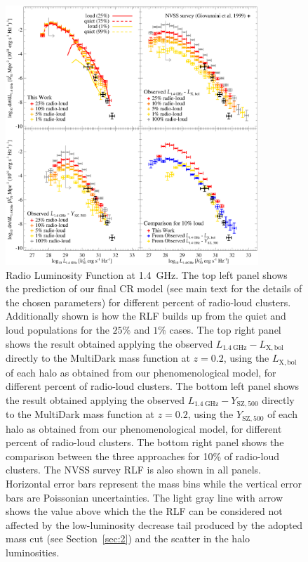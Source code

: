 \documentclass[traditabstract]{aa}
\newcommand{\rmn}{\mathrm}
\begin{document}
\begin{figure}[t]
\centering
\includegraphics[width=0.85\textwidth]{figures/RLFs_1.4.eps}
\caption{Radio Luminosity Function at 1.4~GHz. The top left panel shows the prediction of our final CR model (see main text for the details of the chosen parameters) for different percent of radio-loud clusters. Additionally shown is how the RLF builds up from the quiet and loud populations for the $25\%$ and $1\%$ cases. The top right panel shows the result obtained applying the observed $L_{1.4~\rmn{GHz}}-L_{\rmn{X,bol}}$ directly to the MultiDark mass function at  $z = 0.2$, using the $L_{\rmn{X,bol}}$ of each halo as obtained from our phenomenological model, for different percent of radio-loud clusters. The bottom left panel shows the result obtained applying the observed $L_{1.4~\rmn{GHz}}-Y_{\rmn{SZ}, 500}$ directly to the MultiDark mass function at  $z = 0.2$, using the $Y_{\rmn{SZ}, 500}$ of each halo as obtained from our phenomenological model, for different percent of radio-loud clusters. The bottom right panel shows the comparison between the three approaches for 10\% of radio-loud clusters. The NVSS survey RLF \citep{1999NewA....4..141G} is also shown in all panels. Horizontal error bars represent the mass bins while the vertical error bars are Poissonian uncertainties. The light gray line with arrow shows the value above which the the RLF can be considered not affected by the low-luminosity decrease tail produced by the adopted mass cut (see Section~\ref{sec:2}) and the scatter in the halo luminosities.}
\label{fig:RLF_1.4}
\end{figure}
\end{document}
